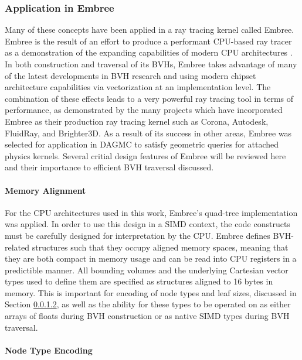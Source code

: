\subsubsection{Application in Embree}

Many of these concepts have been applied in a ray tracing kernel called Embree.
Embree is the result of an effort to produce a performant CPU-based ray tracer
as a demonstration of the expanding capabilities of modern CPU architectures
\cite{Wald_2014}. In both construction and traversal of its BVHs, Embree takes
advantage of many of the latest developments in BVH research and using modern
chipset architecture capabilities via vectorization at an implementation level.
The combination of these effects leads to a very powerful ray tracing tool in
terms of performance, as demonstrated by the many projects which have
incorporated Embree as their production ray tracing kernel such as Corona,
Autodesk, FluidRay, and Brighter3D. As a result of its success in other areas,
Embree was selected for application in DAGMC to satisfy geometric queries for
attached physics kernels. Several critial design features of Embree will be
reviewed here and their importance to efficient BVH traversal discussed.

\paragraph{Memory Alignment}

For the CPU architectures used in this work, Embree's quad-tree implementation
was applied. In order to use this design in a SIMD context, the code constructs
must be carefully designed for interpretation by the CPU. Embree defines
BVH-related structures such that they occupy aligned memory spaces, meaning that
they are both compact in memory usage and can be read into CPU registers in
a predictible manner. All bounding volumes and the underlying Cartesian vector
types used to define them are specified as structures aligned to 16 bytes in
memory. This is important for encoding of node types and leaf sizes, discussed
in Section \ref{sec:node_encoding}, as well as the ability for these types to be
operated on as either arrays of floats during BVH construction or as native SIMD
types during BVH traversal.

\paragraph{Node Type Encoding}\label{sec:node_encoding}

